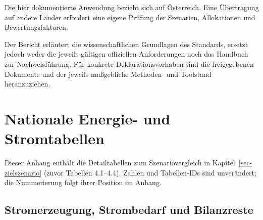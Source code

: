 \documentclass[
  ngerman,
  a4paper,
  DIV=11]{scrreprt}
\begin{document}
Die hier dokumentierte Anwendung bezieht sich auf Österreich. Eine
Übertragung auf andere Länder erfordert eine eigene Prüfung der
Szenarien, Allokationen und Bewertungsfaktoren.

Der Bericht erläutert die wissenschaftlichen Grundlagen des Standards,
ersetzt jedoch weder die jeweils gültigen offiziellen Anforderungen noch
das Handbuch zur Nachweisführung. Für konkrete Deklarationsvorhaben sind
die freigegebenen Dokumente und der jeweils maßgebliche Methoden- und
Toolstand heranzuziehen.

\cleardoublepage
{}
{}
\appendix

\chapter{Nationale Energie- und
Stromtabellen}\label{sec-szenariotabellen}

Dieser Anhang enthält die Detailtabellen zum Szenariovergleich in
Kapitel~\ref{sec-zielszenario} (zuvor Tabellen 4.1--4.4). Zahlen und
Tabellen-IDs sind unverändert; die Nummerierung folgt ihrer Position im
Anhang.

\section{Stromerzeugung, Strombedarf und
Bilanzreste}\label{stromerzeugung-strombedarf-und-bilanzreste}
\end{document}
